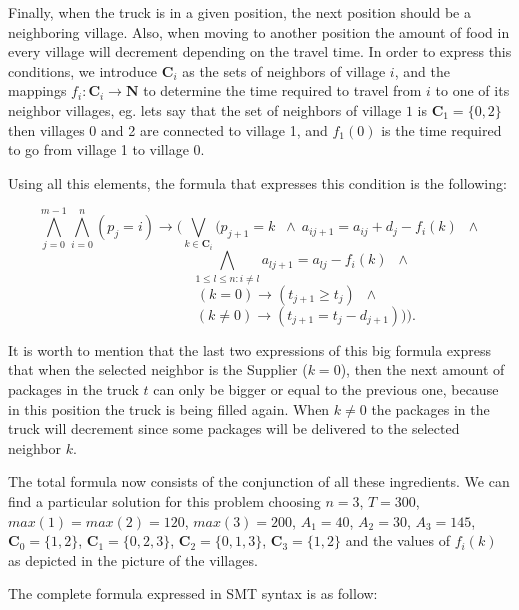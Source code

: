 Finally, when the truck is in a given position, the next position should be a neighboring village. Also, when moving to another position the amount of food in every village will decrement depending on the travel time. In order to express this conditions, we introduce $\textbf{C}_i$ as the sets of neighbors of village $i$, and the mappings $f_i:\textbf{C}_i \rightarrow \textbf{N}$ to determine the time required to travel from $i$ to one of its neighbor villages, eg. lets say that the set of neighbors of village $1$ is $\textbf{C}_1 = \{0,2\}$ then villages 0 and 2 are connected to village 1, and $f_1(0)$ is the time required to go from village 1 to village 0.

Using all this elements, the formula that expresses this condition is the following:

\[\bigwedge_{j=0}^{m-1} \bigwedge_{i=0}^n (p_j = i) \rightarrow (\bigvee_{k \in \textbf{C}_i} (p_{j+1}=k \;\;\wedge\ a_{ij+1} = a_{ij} + d_{j} - f_i(k) \;\;\wedge\]
\[\qquad \qquad \qquad \bigwedge_{1\leq l \leq n:i\neq l} a_{lj+1} = a_{lj} - f_i(k) \;\;\wedge\]
\[\qquad \qquad(k=0) \rightarrow (t_{j+1} \geq t_j) \;\;\wedge\]
\[\qquad \qquad \qquad \; \;(k\neq0) \rightarrow (t_{j+1} = t_j - d_{j+1}) )).\]

It is worth to mention that the last two expressions of this big formula express that when the selected neighbor is the Supplier ($k=0$), then the next amount of packages in the truck $t$ can only be bigger or equal to the previous one, because in this position the truck is being filled again. When $k \neq 0$ the packages in the truck will decrement since some packages will be delivered to the selected neighbor $k$.

The total formula now consists of the conjunction of all these ingredients. We can find a particular solution for this problem choosing $n = 3$, $T = 300$, $max(1) = max(2) = 120$, $max(3) = 200$, $A_1 = 40$, $A_2 = 30$, $A_3 = 145$, $\textbf{C}_0 = \{1,2\}$, $\textbf{C}_1 = \{0,2,3\}$, $\textbf{C}_2 = \{0,1,3\}$, $\textbf{C}_3 = \{1,2\}$ and the values of $f_i(k)$ as depicted in the picture of the villages.

The complete formula expressed in SMT syntax is as follow:

\vspace{3mm}

